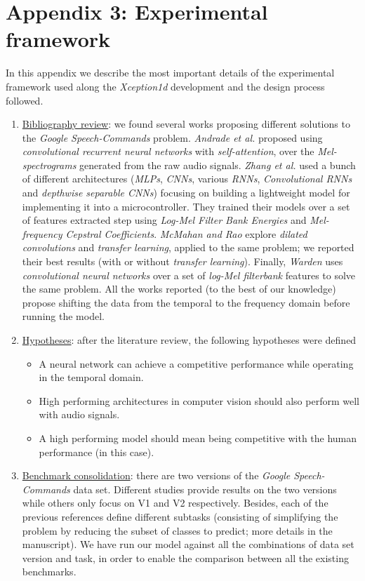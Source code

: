 \documentclass{elsarticle}
\begin{document}
\linenumbers

\section*{Appendix 3: Experimental framework}
In this appendix we describe the most important details of the experimental framework used along the \textit{Xception1d} development and the design process followed.

\begin{enumerate}
	\item \underline{Bibliography review}: we found several works proposing different solutions to the \textit{Google Speech-Commands} problem.  \textit{Andrade et al.} \cite{Andrade2018} proposed using \textit{convolutional recurrent neural networks} with \textit{self-attention}, over the \textit{Mel-spectrograms} generated from the raw audio signals. \textit{Zhang et al.} \cite{Zhang2017} used a bunch of different architectures (\textit{MLPs}, \textit{CNNs}, various \textit{RNNs}, \textit{Convolutional RNNs} and \textit{depthwise separable CNNs}) focusing on building a lightweight model for implementing it into a microcontroller. They trained their models over a set of features extracted step using \textit{Log-Mel Filter Bank Energies} and \textit{Mel-frequency Cepstral Coefficients}.  \textit{McMahan and Rao} \cite{McMahan2018} explore \textit{dilated convolutions} and \textit{transfer learning}, applied to the same problem; we reported their best results (with or without \textit{transfer learning}). Finally, \textit{Warden} \cite{Warden2018} uses \textit{convolutional neural networks} over a set of \textit{log-Mel filterbank} features to solve the same problem. All the works reported (to the best of our knowledge) propose shifting the data from the temporal to the frequency domain before running the model. 
	\item \underline{Hypotheses}: after the literature review, the following hypotheses were defined
	\begin{itemize}
		\item A neural network can achieve a competitive performance while operating in the temporal domain.
		\item High performing architectures in computer vision should also perform well with audio signals.
		\item A high performing model should mean being competitive with the human performance (in this case).
	\end{itemize}
	\item \underline{Benchmark consolidation}: there are two versions of the \textit{Google Speech-Commands} data set. Different studies \cite{Andrade2018, Warden2018} provide results on the two versions while others \cite{McMahan2018, Zhang2017} only focus on V1 and V2 respectively. Besides, each of the previous references define different subtasks (consisting of simplifying the problem by reducing the subset of classes to predict; more details in the manuscript). We have run our model against all the combinations of data set version and task, in order to enable the comparison between all the existing benchmarks. 

\end{enumerate}
\end{document}
